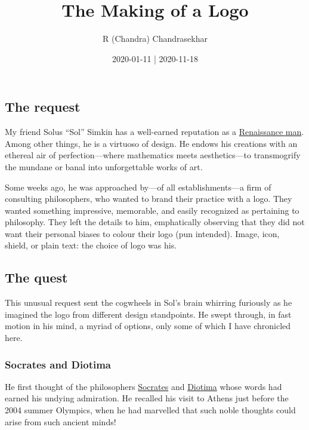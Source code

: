 \documentclass[
  12pt,
  british,
  a4paper,
]{article}
\title{The Making of a Logo}
\author{R (Chandra) Chandrasekhar}
\date{2020-01-11 | 2020-11-18}
\begin{document}
\maketitle

\setlength{\parindent}{0pt} %
\thispagestyle{empty}


\hypertarget{the-request}{%
\subsection{The request}\label{the-request}}

My friend Solus ``Sol'' Simkin has a well-earned reputation as a
\href{https://www.thefreedictionary.com/renaissance+man}{Renaissance
man}. Among other things, he is a virtuoso of design. He endows his
creations with an ethereal air of perfection---where mathematics meets
aesthetics---to transmogrify the mundane or banal into unforgettable
works of art.

Some weeks ago, he was approached by---of all establishments---a firm of
consulting philosophers, who wanted to brand their practice with a logo.
They wanted something impressive, memorable, and easily recognized as
pertaining to philosophy. They left the details to him, emphatically
observing that they did not want their personal biases to colour their
logo (pun intended). Image, icon, shield, or plain text: the choice of
logo was his.

\hypertarget{the-quest}{%
\subsection{The quest}\label{the-quest}}

This unusual request sent the cogwheels in Sol's brain whirring
furiously as he imagined the logo from different design standpoints. He
swept through, in fast motion in his mind, a myriad of options, only
some of which I have chronicled here.

\hypertarget{socrates-and-diotima}{%
\subsubsection{Socrates and Diotima}\label{socrates-and-diotima}}

He first thought of the philosophers
\href{https://en.wikipedia.org/wiki/Socrates}{Socrates} and
\href{https://en.wikipedia.org/wiki/Diotima_of_Mantinea}{Diotima} whose
words had earned his undying admiration. He recalled his visit to Athens
just before the 2004 summer Olympics, when he had marvelled that such
noble thoughts could arise from such ancient minds!
\end{document}
